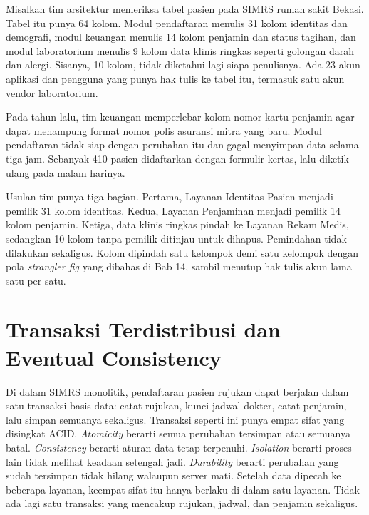 \begin{kasus}[title={Kasus Medikara Health: Satu Tabel Pasien, Tiga Penulis}]
  Misalkan tim arsitektur memeriksa tabel pasien pada SIMRS rumah sakit Bekasi. Tabel itu punya 64
  kolom. Modul pendaftaran menulis 31 kolom identitas dan demografi, modul keuangan menulis 14 kolom
  penjamin dan status tagihan, dan modul laboratorium menulis 9 kolom data klinis ringkas seperti
  golongan darah dan alergi. Sisanya, 10 kolom, tidak diketahui lagi siapa penulisnya. Ada 23 akun
  aplikasi dan pengguna yang punya hak tulis ke tabel itu, termasuk satu akun vendor laboratorium.

  Pada tahun lalu, tim keuangan memperlebar kolom nomor kartu penjamin agar dapat menampung format
  nomor polis asuransi mitra yang baru. Modul pendaftaran tidak siap dengan perubahan itu dan gagal
  menyimpan data selama tiga jam. Sebanyak 410 pasien didaftarkan dengan formulir kertas, lalu
  diketik ulang pada malam harinya.

  Usulan tim punya tiga bagian. Pertama, Layanan Identitas Pasien menjadi pemilik 31 kolom
  identitas. Kedua, Layanan Penjaminan menjadi pemilik 14 kolom penjamin. Ketiga, data klinis
  ringkas pindah ke Layanan Rekam Medis, sedangkan 10 kolom tanpa pemilik ditinjau untuk dihapus.
  Pemindahan tidak dilakukan sekaligus. Kolom dipindah satu kelompok demi satu kelompok dengan pola
  \textit{strangler fig} yang dibahas di Bab 14, sambil menutup hak tulis akun lama satu per satu.
\end{kasus}

\section{Transaksi Terdistribusi dan Eventual Consistency}
\label{sec:ch10-transaksi}

Di dalam SIMRS monolitik, pendaftaran pasien rujukan dapat berjalan dalam satu transaksi basis data:
catat rujukan, kunci jadwal dokter, catat penjamin, lalu simpan semuanya sekaligus. Transaksi seperti
ini punya empat sifat yang disingkat ACID. \textit{Atomicity} berarti semua perubahan tersimpan atau
semuanya batal. \textit{Consistency} berarti aturan data tetap terpenuhi. \textit{Isolation} berarti
proses lain tidak melihat keadaan setengah jadi. \textit{Durability} berarti perubahan yang sudah
tersimpan tidak hilang walaupun server mati. Setelah data dipecah ke beberapa layanan, keempat
sifat itu hanya berlaku di dalam satu layanan. Tidak ada lagi satu transaksi yang mencakup rujukan,
jadwal, dan penjamin sekaligus.

